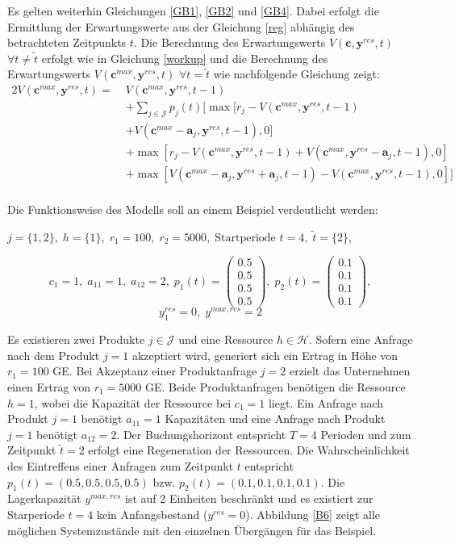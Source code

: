 Es gelten weiterhin Gleichungen \eqref{GB1}, \eqref{GB2} und \eqref{GB4}. Dabei erfolgt die Ermittlung der Erwartungswerte aus der Gleichung \eqref{reg} abhängig des betrachteten Zeitpunkts $t$. Die Berechnung des Erwartungswerts $V(\textbf{c}, \textbf{y}^{res}, t)$ $\forall t\neq\tilde{t}$ erfolgt wie in Gleichung \eqref{workup} und die Berechnung des Erwartungswerts $V(\textbf{c}^{max}, \textbf{y}^{res}, t)$ $\forall t=\tilde{t}$ wie nachfolgende Gleichung zeigt:
\begin{alignat*}{2}
 V(\textbf{c}^{max}, \textbf{y}^{res}, t) = \;& V(\textbf{c}^{max}, \textbf{y}^{res}, t-1)\\
&+ \sum_{j \in \mathcal{J}}p_{j}(t)[\max[r_{j} - V(\textbf{c}^{max}, \textbf{y}^{res}, t-1)\\
&+ V(\textbf{c}^{max}-\textbf{a}_j, \textbf{y}^{res}, t-1),0] \\
&+ \max[r_{j} - V(\textbf{c}^{max}, \textbf{y}^{res}, t-1) + V(\textbf{c}^{max}, \textbf{y}^{res}-\textbf{a}_j, t-1),0]\\
&+ \max[V(\textbf{c}^{max}-\textbf{a}_j, \textbf{y}^{res}+\textbf{a}_j, t-1) - V(\textbf{c}^{max}, \textbf{y}^{res}, t-1) ,0]]\\
\end{alignat*}

Die Funktionsweise des Modells soll an einem Beispiel verdeutlicht werden:
\begin{center}
$j = \{1, 2\}, \; h = \{1\}, \; r_{1} = 100, \; r_{2} = 5000, \; \text{Startperiode } t=4, \; \tilde{t}=\{2\} $,
\end{center}
\[
    c_{1}=1, \;
    a_{11}=1, \;
     a_{12}=2, \;
     p_{1}(t)=\begin{pmatrix} 0.5\\ 0.5\\ 0.5\\ 0.5  \end{pmatrix}, \;
     p_{2}(t)=\begin{pmatrix} 0.1\\ 0.1\\ 0.1\\ 0.1  \end{pmatrix},
  \]
  \[
    y_{1}^{res}= 0, \;
    y^{max,res}=2
      \]
      
Es existieren zwei Produkte $j\in\mathcal{J}$ und eine Ressource $h\in\mathcal{H}$. Sofern eine Anfrage nach dem Produkt $j=1$ akzeptiert wird, generiert sich ein Ertrag in Höhe von $r_1=100$ GE. Bei Akzeptanz einer Produktanfrage $j=2$ erzielt das Unternehmen einen Ertrag von $r_1=5000$ GE. Beide Produktanfragen benötigen die Ressource $h=1$, wobei die Kapazität der Ressource bei $c_1=1$ liegt. Ein Anfrage nach Produkt $j=1$ benötigt $a_11=1$ Kapazitäten und eine Anfrage nach Produkt $j=1$ benötigt $a_12=2$. Der Buchungshorizont entspricht $T=4$ Perioden und zum Zeitpunkt $\tilde{t}=2$ erfolgt eine Regeneration der Ressourcen. Die Wahrscheinlichkeit des Eintreffens einer Anfragen zum Zeitpunkt $t$ entspricht $ p_{1}(t)=(0.5, 0.5, 0.5, 0.5)$ bzw. $ p_{2}(t)=(0.1, 0.1, 0.1, 0.1)$. Die Lagerkapazität $y^{max,res}$ ist auf 2 Einheiten beschränkt und es existiert zur Starperiode $t=4$ kein Anfangsbestand ($y^{res}=0$). Abbildung \ref{B6} zeigt alle möglichen Systemzustände mit den einzelnen Übergängen für das Beispiel. 

